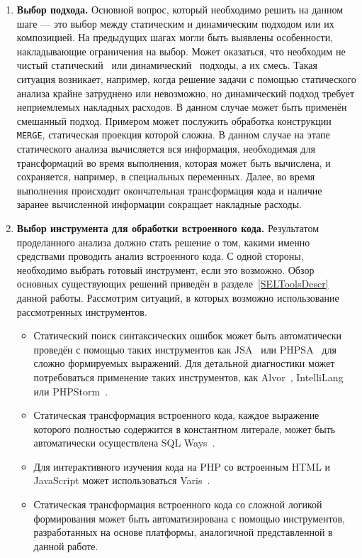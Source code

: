\begin{enumerate}
  \item \textbf{Выбор подхода.} Основной вопрос, который необходимо решить на данном шаге --- это выбор между статическим и динамическим подходом или их композицией. На предыдущих шагах могли быть выявлены особенности, накладывающие ограничения на выбор. Может оказаться, что необходим не чистый статический~\cite{Syrcose} или динамический~\cite{DynamicDSQLTranslation} подходы, а их смесь. Такая ситуация возникает, например, когда решение задачи с помощью статического анализа крайне затруднено или невозможно, но динамический подход требует неприемлемых накладных расходов. В данном случае может быть применён смешанный подход. Примером может послужить обработка конструкции \verb|MERGE|, статическая проекция которой сложна. В данном случае на этапе статического анализа вычисляется вся информация, необходимая для трансформаций во время выполнения, которая может быть вычислена, и сохраняется, например, в специальных переменных. Далее, во время выполнения происходит окончательная трансформация кода и наличие заранее вычисленной информации сокращает накладные расходы.
  
  \item \textbf{Выбор инструмента для обработки встроенного кода.} Результатом проделанного анализа должно стать решение о том, какими именно средствами проводить анализ встроенного кода. С одной стороны, необходимо выбрать готовый инструмент, если это возможно. Обзор основных существующих решений  приведён в разделе~\ref{SELToolsDescr} данной работы. Рассмотрим ситуаций, в которых возможно использование рассмотренных инструментов.
  \begin{itemize}
    \item Статический поиск синтаксических ошибок может быть автоматически проведён с помощью таких инструментов как JSA~\cite{JSAUrl} или PHPSA~\cite{PHPSAUrl} для сложно формируемых выражений. Для детальной диагностики может потребоваться применение таких инструментов, как Alvor~\cite{AlvorUrl}, IntelliLang~\cite{IntelliLang} или PHPStorm~\cite{PHPStorm}.
    \item Статическая трансформация встроенного кода, каждое выражение которого полностью содержится в константном литерале, может быть автоматически осуществлена SQL Ways~\cite{SQLWays}.
    \item Для интерактивного изучения кода на PHP со встроенным HTML и JavaScript может использоваться Varis~\cite{Varis}.
    \item Статическая трансформация встроенного кода со сложной логикой формирования может быть автоматизирована с помощью инструментов, разработанных на основе платформы, аналогичной представленной в данной работе.
  \end{itemize}
  

\end{enumerate}
